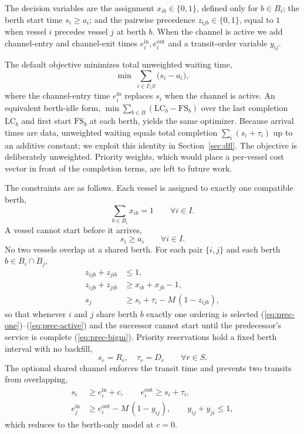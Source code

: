 The decision variables are the assignment $x_{ib}\in\{0,1\}$, defined only for
$b\in B_i$; the berth start time $s_i\ge a_i$; and the pairwise precedence
$z_{ijb}\in\{0,1\}$, equal to $1$ when vessel $i$ precedes vessel $j$ at berth $b$.
When the channel is active we add channel-entry and channel-exit times
$e^{\text{in}}_i,e^{\text{out}}_i$ and a transit-order variable $y_{ij}$.

The default objective minimizes total unweighted waiting time,
\begin{equation}\label{eq:obj}
\min \; \sum_{i\in I\setminus S}\bigl(s_i-a_i\bigr),
\end{equation}
where the channel-entry time $e^{\text{in}}_i$ replaces $s_i$ when the channel is
active. An equivalent berth-idle form, $\min\sum_{b\in B}(\mathrm{LC}_b-\mathrm{FS}_b)$
over the last completion $\mathrm{LC}_b$ and first start $\mathrm{FS}_b$ at each
berth, yields the same optimizer. Because arrival times are data, unweighted
waiting equals total completion $\sum_{i}(s_i+\tau_i)$ up to an additive
constant; we exploit this identity in Section~\ref{sec:dfl}. The objective is
deliberately unweighted. Priority weights, which would place a per-vessel cost
vector in front of the completion terms, are left to future work.

The constraints are as follows. Each vessel is assigned to exactly one compatible
berth,
\begin{equation}\label{eq:assign}
\sum_{b\in B_i} x_{ib}=1 \qquad \forall i\in I .
\end{equation}
A vessel cannot start before it arrives,
\begin{equation}\label{eq:release}
s_i \ge a_i \qquad \forall i\in I .
\end{equation}
No two vessels overlap at a shared berth. For each pair $\{i,j\}$ and each berth
$b\in B_i\cap B_j$,
\begin{align}
z_{ijb}+z_{jib} &\le 1, \label{eq:prec-one}\\
z_{ijb}+z_{jib} &\ge x_{ib}+x_{jb}-1, \label{eq:prec-active}\\
s_j &\ge s_i + \tau_i - M\,(1-z_{ijb}), \label{eq:prec-bigm}
\end{align}
so that whenever $i$ and $j$ share berth $b$ exactly one ordering is selected
(\ref{eq:prec-one})--(\ref{eq:prec-active}) and the successor cannot start until
the predecessor's service is complete (\ref{eq:prec-bigm}). Priority
reservations hold a fixed berth interval with no backfill,
\begin{equation}\label{eq:reserve}
s_r = R_r, \quad \tau_r = D_r \qquad \forall r\in S .
\end{equation}
The optional shared channel enforces the transit time and prevents two transits
from overlapping,
\begin{align}
s_i &\ge e^{\text{in}}_i + c, \qquad e^{\text{out}}_i \ge s_i + \tau_i, \label{eq:chan-time}\\
e^{\text{in}}_j &\ge e^{\text{out}}_i - M\,(1-y_{ij}), \qquad y_{ij}+y_{ji}\le 1, \label{eq:chan-order}
\end{align}
which reduces to the berth-only model at $c=0$.

